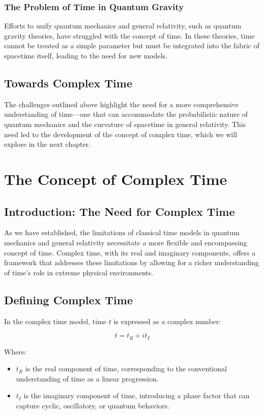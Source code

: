 \documentclass{article}
\begin{document}
\subsubsection{The Problem of Time in Quantum Gravity}

Efforts to unify quantum mechanics and general relativity, such as quantum gravity theories, have struggled with the concept of time. In these theories, time cannot be treated as a simple parameter but must be integrated into the fabric of spacetime itself, leading to the need for new models.

\subsection{Towards Complex Time}

The challenges outlined above highlight the need for a more comprehensive understanding of time—one that can accommodate the probabilistic nature of quantum mechanics and the curvature of spacetime in general relativity. This need led to the development of the concept of complex time, which we will explore in the next chapter.



\section{The Concept of Complex Time}

\subsection{Introduction: The Need for Complex Time}

As we have established, the limitations of classical time models in quantum mechanics and general relativity necessitate a more flexible and encompassing concept of time. Complex time, with its real and imaginary components, offers a framework that addresses these limitations by allowing for a richer understanding of time’s role in extreme physical environments.

\subsection{Defining Complex Time}

In the complex time model, time \( t \) is expressed as a complex number:

\[
t = t_R + i t_I
\]

Where:
\begin{itemize}
    \item \( t_R \) is the real component of time, corresponding to the conventional understanding of time as a linear progression.
    \item \( t_I \) is the imaginary component of time, introducing a phase factor that can capture cyclic, oscillatory, or quantum behaviors.
\end{itemize}
\end{document}
